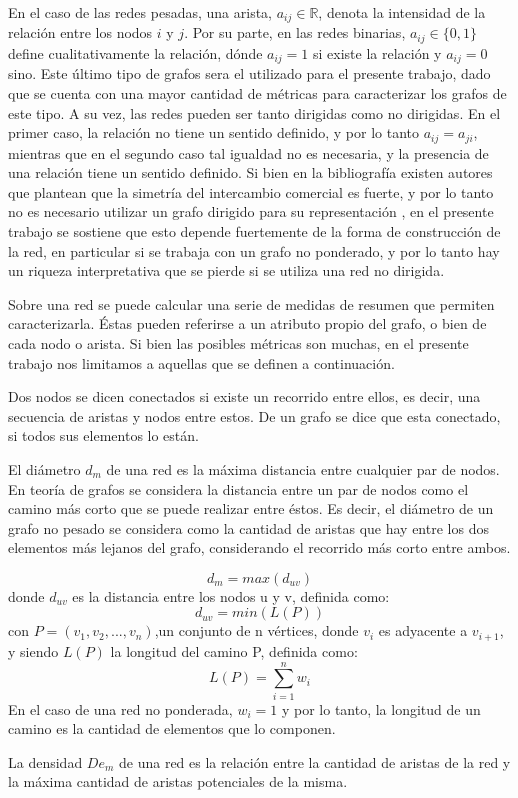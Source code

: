 \documentclass[class=article, crop=false]{standalone}
\begin{document}
En el caso de las redes pesadas, una arista, $a_{ij} \in \mathbb{R}$, denota la intensidad de la relación entre los nodos $i$ y $j$. Por su parte, en las redes binarias, $a_{ij} \in \{0,1\}$ define cualitativamente la relación, dónde $a_{ij} = 1$ si existe la relación y $a_{ij} = 0$ sino. Este último tipo de grafos sera el utilizado para el presente trabajo, dado que se cuenta con una mayor cantidad de métricas para caracterizar los grafos de este tipo.      
A su vez, las redes pueden ser tanto dirigidas como no dirigidas. En el primer caso, la relación no tiene un sentido definido, y por lo tanto $a_{ij} = a_{ji}$, mientras que en el segundo caso tal igualdad no es necesaria, y la presencia de una relación tiene un sentido definido. Si bien en la bibliografía existen autores que plantean que la simetría del intercambio comercial es fuerte, y por lo tanto no es necesario utilizar un grafo dirigido para su representación \cite{Fagiolo2007}, en el presente trabajo se sostiene que esto depende fuertemente de la forma de construcción de la red, en particular si se trabaja con un grafo no ponderado, y por lo tanto hay un riqueza interpretativa que se pierde si se utiliza una red no dirigida.       


Sobre una red se puede calcular una serie de medidas de resumen que permiten caracterizarla. Éstas pueden referirse a un atributo propio del grafo, o bien de cada nodo o arista. Si bien las posibles métricas son muchas, en el presente trabajo nos limitamos a aquellas que se definen a continuación. \par    
Dos nodos se dicen conectados si existe un recorrido entre ellos, es decir, una secuencia de aristas y nodos entre estos. De un grafo se dice que esta conectado, si todos sus elementos lo están. \par
El diámetro $d_m$ de una red es la máxima distancia entre cualquier par de nodos. En teoría de grafos se considera la distancia entre un par de nodos como el camino más corto que se puede realizar entre éstos. Es decir, el diámetro de un grafo no pesado se considera como la cantidad de aristas que hay entre los dos elementos más lejanos del grafo, considerando el recorrido más corto entre ambos. 

$$
d_m = max(d_{uv})
$$
donde $d_{uv}$ es la distancia entre los nodos u y v, definida como:
$$
d_{uv} = min(L(P))
$$
con $P = (v_1, v_2, ..., v_n)$,un conjunto de n vértices, donde $v_i$ es adyacente a $v_{i+1}$, y siendo $L(P)$ la longitud del camino P, definida como:
$$
L(P) = \sum_{i=1}^{n} w_i
$$
En el caso de una red no ponderada, $w_i = 1$ y por lo tanto, la longitud de un camino es la cantidad de elementos que lo componen. \par
La densidad $De_m$ de una red es la relación entre la cantidad de aristas de la red y la máxima cantidad de aristas potenciales de la misma. 
\end{document}
